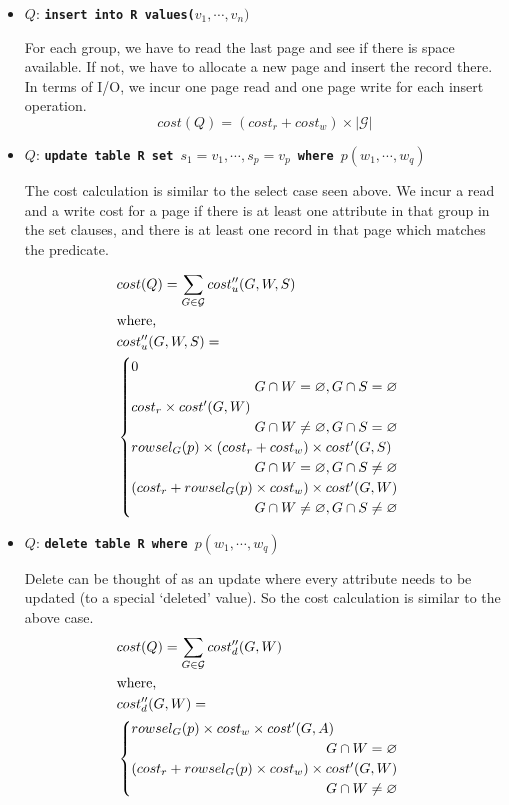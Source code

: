 \documentclass[twocolumn,11pt]{article}
\newcommand{\g}{\mathcal{G}}
\newcommand{\sql}[1]{{\tt \textbf{#1}}}
\begin{document}
\begin{itemize}
	\item $Q$: \sql{insert into R values($v_1,\cdots,v_n)$}
	
	For each group, we have to read the last page and see if there is
	space available. If not, we have to allocate a new page and insert
	the record there. In terms of I/O, we incur one page read and one
	page write for each insert operation.
	\[ cost(Q) = (cost_r + cost_w) \times |\g| \]
	
	\item $Q$: \sql{update table R set $s_1=v_1,\cdots,s_p=v_p$ where $p(w_1,\cdots,w_q)$}
	
	The cost calculation is similar to the select case seen above. We
	incur a read and a write cost for a page if there is at least one attribute
	in that group in the set clauses, and there is at least one
	record in that page which matches the predicate.
	
	\begin{align*}
		&cost(Q) = \sum_{G \in \g} cost_u''(G,W,S) \\
		&\text{where,} \\
		&cost_u''(G,W,S) = \\
		&\begin{cases}
			0				  									 	\\\hfill G \cap W  =   \varnothing, G \cap S  =   \varnothing \\
			cost_r \times cost'(G,W) & 							 	\\\hfill G \cap W \neq \varnothing, G \cap S  =   \varnothing \\
			rowsel_G(p) \times (cost_r + cost_w) \times cost'(G,S)  \\\hfill G \cap W  =   \varnothing, G \cap S \neq \varnothing \\
			(cost_r + rowsel_G(p) \times cost_w) \times cost'(G,W)  \\\hfill G \cap W \neq \varnothing, G \cap S \neq \varnothing \\
		\end{cases}
	\end{align*}
	
	\item $Q$: \sql{delete table R where $p(w_1,\cdots,w_q)$}
	
	Delete can be thought of as an update where every attribute needs
	to be updated (to a special `deleted' value). So the cost calculation
	is similar to the above case.
	\begin{align*}
		&cost(Q) = \sum_{G \in \g} cost_d''(G,W) \\
		&\text{where,} \\
		&cost_d''(G,W) = \\
		&\begin{cases}
			rowsel_G(p) \times cost_w \times cost'(G,A)				\\\hfill G \cap W  =   \varnothing \\
			(cost_r + rowsel_G(p) \times cost_w) \times cost'(G,W)	\\\hfill G \cap W \neq \varnothing
		\end{cases}
	\end{align*}
	

\end{itemize}
\end{document}
